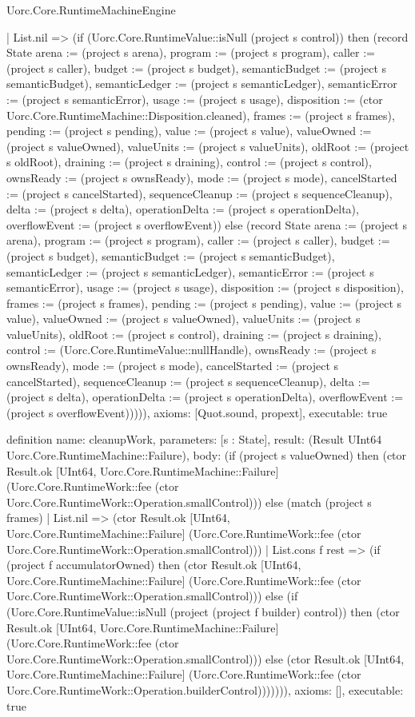 \begin{lexlean}{Uorc.Core.RuntimeMachineEngine}
\begin{semanticmodule}
{    | List.nil => (if (Uorc.Core.RuntimeValue::isNull (project s control)) then (record State {arena := (project s arena), program := (project s program), caller := (project s caller), budget := (project s budget), semanticBudget := (project s semanticBudget), semanticLedger := (project s semanticLedger), semanticError := (project s semanticError), usage := (project s usage), disposition := (ctor Uorc.Core.RuntimeMachine::Disposition.cleaned), frames := (project s frames), pending := (project s pending), value := (project s value), valueOwned := (project s valueOwned), valueUnits := (project s valueUnits), oldRoot := (project s oldRoot), draining := (project s draining), control := (project s control), ownsReady := (project s ownsReady), mode := (project s mode), cancelStarted := (project s cancelStarted), sequenceCleanup := (project s sequenceCleanup), delta := (project s delta), operationDelta := (project s operationDelta), overflowEvent := (project s overflowEvent)}) else (record State {arena := (project s arena), program := (project s program), caller := (project s caller), budget := (project s budget), semanticBudget := (project s semanticBudget), semanticLedger := (project s semanticLedger), semanticError := (project s semanticError), usage := (project s usage), disposition := (project s disposition), frames := (project s frames), pending := (project s pending), value := (project s value), valueOwned := (project s valueOwned), valueUnits := (project s valueUnits), oldRoot := (project s control), draining := (project s draining), control := (Uorc.Core.RuntimeValue::nullHandle), ownsReady := (project s ownsReady), mode := (project s mode), cancelStarted := (project s cancelStarted), sequenceCleanup := (project s sequenceCleanup), delta := (project s delta), operationDelta := (project s operationDelta), overflowEvent := (project s overflowEvent)})))),
  axioms: [Quot.sound, propext],
  executable: true
}

definition{
  name: cleanupWork,
  parameters: [s : State],
  result: (Result UInt64 Uorc.Core.RuntimeMachine::Failure),
  body: (if (project s valueOwned) then (ctor Result.ok [UInt64, Uorc.Core.RuntimeMachine::Failure] (Uorc.Core.RuntimeWork::fee (ctor Uorc.Core.RuntimeWork::Operation.smallControl))) else (match (project s frames)
    | List.nil => (ctor Result.ok [UInt64, Uorc.Core.RuntimeMachine::Failure] (Uorc.Core.RuntimeWork::fee (ctor Uorc.Core.RuntimeWork::Operation.smallControl)))
    | List.cons f rest => (if (project f accumulatorOwned) then (ctor Result.ok [UInt64, Uorc.Core.RuntimeMachine::Failure] (Uorc.Core.RuntimeWork::fee (ctor Uorc.Core.RuntimeWork::Operation.smallControl))) else (if (Uorc.Core.RuntimeValue::isNull (project (project f builder) control)) then (ctor Result.ok [UInt64, Uorc.Core.RuntimeMachine::Failure] (Uorc.Core.RuntimeWork::fee (ctor Uorc.Core.RuntimeWork::Operation.smallControl))) else (ctor Result.ok [UInt64, Uorc.Core.RuntimeMachine::Failure] (Uorc.Core.RuntimeWork::fee (ctor Uorc.Core.RuntimeWork::Operation.builderControl))))))),
  axioms: [],
  executable: true
}


\end{semanticmodule}
\end{lexlean}

